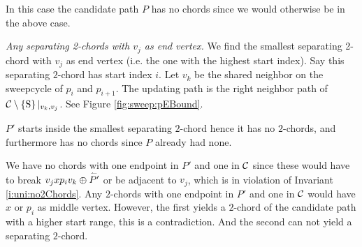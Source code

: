     In this case the candidate path $P$ has no chords since we would otherwise be in the above case.

    \emph{Any separating 2-chords with $v_j$ as end vertex.}
      We find the smallest separating 2-chord with $v_j$ as end vertex (i.e. the one with the highest start index). Say this separating $2$-chord has start index $i$.
      Let $v_k$ be the shared neighbor on the sweepcycle of $p_{i}$ and $p_{i +1}$. The updating path is the right neighbor path of $\mathcal{C} \setminus \left\lbrace {\mathrm{S}} \right\rbrace|_{v_k, v_j}$. See Figure \ref{fig:sweep:pEBound}.

      $P'$ starts inside the smallest separating $2$-chord hence it has no $2$-chords, and furthermore has no chords since $P$ already had none.

      We have no chords with one endpoint in $P'$ and one in $\mathcal{C}$ since these would have to break $v_j x p_i v_k \oplus \accentset{\leftharpoonup}{P'}$ or be adjacent to $v_j$, which is in violation of Invariant \ref{i:uni:no2Chords}.
      Any $2$-chords with one endpoint in $P'$ and one in $\mathcal{C}$ would have $x$ or $p_i$ as middle vertex.
      However, the first yields a $2$-chord of the candidate path with a higher start range, this is a contradiction.
      And the second can not yield a separating $2$-chord. %

